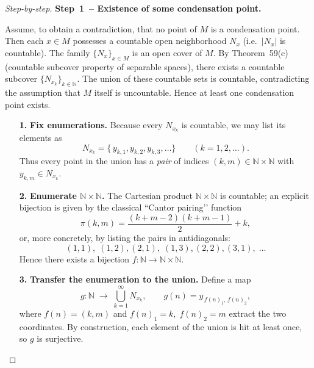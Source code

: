 \documentclass[12pt]{article}
\theoremstyle{definition} %
\theoremstyle{plain} %
\begin{document}
\begin{proof}[Step-by-step]
  
  \textbf{Step 1 -- Existence of some condensation point.}

  Assume, to obtain a contradiction, that no point of \(M\) is a
  condensation point.  Then each \(x\in M\) possesses a countable open
  neighborhood \(N_x\) (i.e.\ \(\lvert N_x\rvert\) is countable).
  The family \(\{N_x\}_{x\in M}\) is an open cover of \(M\).
  By Theorem 59(c) (countable subcover property of separable spaces),
  there exists a countable subcover \(\{N_{x_k}\}_{k\in\mathbb N}\).
  The union of these countable sets is countable, contradicting the
  assumption that \(M\) itself is uncountable.  Hence at least one
  condensation point exists.
%

\begin{enumerate}
  \item[\textbf{1.}] %
      \textbf{Fix enumerations.}  
      Because every $N_{x_k}$ is countable, we may list its elements as
      \[
          N_{x_k}=\{\,y_{k,1},y_{k,2},y_{k,3},\dots\}
          \qquad(k=1,2,\dots).
      \]
      Thus every point in the union has a \emph{pair} of indices
      $(k,m)\in\mathbb N\times\mathbb N$ with
      $y_{k,m}\in N_{x_k}$.

  \item[\textbf{2.}] %
      \textbf{Enumerate $\mathbb N\times\mathbb N$.}  
      The Cartesian product $\mathbb N\times\mathbb N$ is countable; an
      explicit bijection is given by the classical “Cantor pairing’’
      function
      \[
          \pi(k,m)=\frac{(k+m-2)(k+m-1)}{2}+k,
      \]
      or, more concretely, by listing the pairs in antidiagonals:
      \[
          (1,1),\;(1,2),(2,1),\;(1,3),(2,2),(3,1),\;\ldots
      \]
      Hence there exists a bijection
      \(
          f:\mathbb N\longrightarrow\mathbb N\times\mathbb N.
      \)

  \item[\textbf{3.}] %
      \textbf{Transfer the enumeration to the union.}  
      Define a map
      \[
          g:\mathbb N\;\longrightarrow\;\bigcup_{k=1}^{\infty}N_{x_k},
          \qquad
          g(n)=y_{\,f(n)_1,\,f(n)_2},
      \]
      where $f(n)=(k,m)$ and $f(n)_1=k,\;f(n)_2=m$ extract the two
      coordinates.  By construction, each element of the union is hit at
      least once, so $g$ is surjective.


\end{enumerate}
\end{proof}
\end{document}

